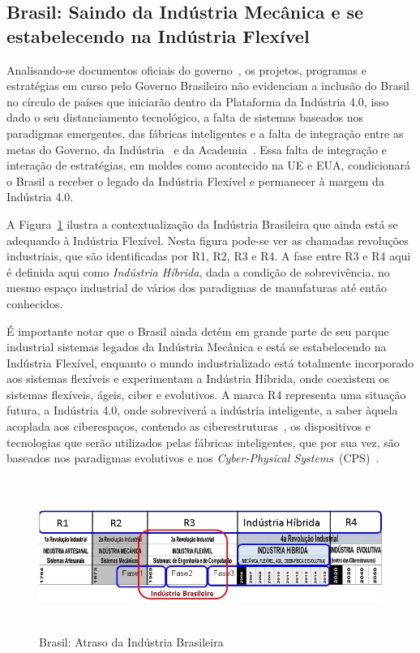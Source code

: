 
\subsection{Brasil: Saindo da Indústria Mecânica e se estabelecendo na Indústria Flexível }	 


Analisando-se documentos oficiais do governo~\cite{PRESIDENCIADAREPUBLICA2014a}, os projetos, programas e estratégias em curso pelo Governo Brasileiro não evidenciam a inclusão do Brasil no círculo de países que iniciarão dentro da Plataforma da Indústria 4.0, isso dado o seu distanciamento tecnológico, a falta de sistemas baseados nos paradigmas emergentes, das fábricas inteligentes e a falta de integração entre as metas do Governo, da Indústria~\cite{CNI2013} e da Academia~\cite{CAPESVI2011}. Essa falta de integração e interação de estratégias, em moldes como acontecido na UE e EUA, condicionará o Brasil a receber o legado da Indústria Flexível e permanecer à margem da Indústria 4.0.



A Figura~\ref{fig:brasil_atraso} ilustra a contextualização da Indústria Brasileira que ainda está se adequando à Indústria Flexível. Nesta figura pode-se ver as chamadas revoluções industriais, que são identificadas por R1, R2, R3 e R4.  A fase entre R3 e R4 aqui é definida aqui como \emph{Indústria Híbrida}, dada a condição de sobrevivência, no mesmo espaço industrial de vários dos paradigmas de manufaturas até então conhecidos.

É importante notar que o Brasil ainda detém em grande parte de seu parque industrial sistemas legados da Indústria Mecânica e está se estabelecendo na Indústria Flexível, enquanto o mundo industrializado está totalmente incorporado aos sistemas flexíveis e experimentam a Indústria Híbrida, onde coexistem os sistemas flexíveis, ágeis, ciber e evolutivos. A marca R4 representa uma situação futura, a Indústria 4.0, onde sobreviverá a indústria inteligente, a saber àquela acoplada aos ciberespaços, contendo as ciberestruturas~\cite{Atkins2003}, os dispositivos e tecnologias que serão utilizados pelas fábricas inteligentes, que por sua vez, são baseados nos paradigmas evolutivos e nos \textit{Cyber-Physical Systems}~(CPS)~\cite{LEE2008}.

\begin{figure}
	\centering
	\includegraphics[width=16cm, height=5cm]{img/F3_MeDSE_GIB.jpg} 
	\caption{Brasil: Atraso da Indústria Brasileira}
	\label{fig:brasil_atraso}
\end{figure}

